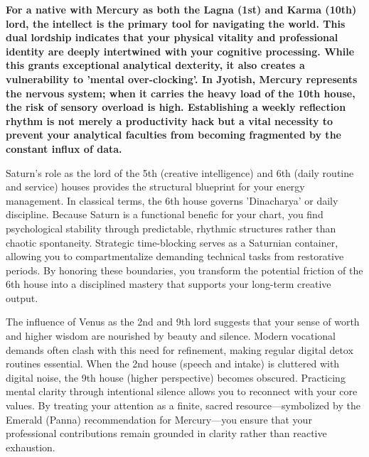 
\label{topic63}

{\fontsize{9.5}{13.8}\selectfont\bfseries\color{DeepSlate} For a native with Mercury as both the Lagna (1st) and Karma (10th) lord, the intellect is the primary tool for navigating the world. This dual lordship indicates that your physical vitality and professional identity are deeply intertwined with your cognitive processing. While this grants exceptional analytical dexterity, it also creates a vulnerability to 'mental over-clocking'. In Jyotish, Mercury represents the nervous system; when it carries the heavy load of the 10th house, the risk of sensory overload is high. Establishing a weekly reflection rhythm is not merely a productivity hack but a vital necessity to prevent your analytical faculties from becoming fragmented by the constant influx of data.}\par\vspace{2mm}

{\fontsize{9}{13}\selectfont Saturn's role as the lord of the 5th (creative intelligence) and 6th (daily routine and service) houses provides the structural blueprint for your energy management. In classical terms, the 6th house governs 'Dinacharya' or daily discipline. Because Saturn is a functional benefic for your chart, you find psychological stability through predictable, rhythmic structures rather than chaotic spontaneity. Strategic time-blocking serves as a Saturnian container, allowing you to compartmentalize demanding technical tasks from restorative periods. By honoring these boundaries, you transform the potential friction of the 6th house into a disciplined mastery that supports your long-term creative output.}\par\vspace{1.8mm}

{\fontsize{9}{13}\selectfont The influence of Venus as the 2nd and 9th lord suggests that your sense of worth and higher wisdom are nourished by beauty and silence. Modern vocational demands often clash with this need for refinement, making regular digital detox routines essential. When the 2nd house (speech and intake) is cluttered with digital noise, the 9th house (higher perspective) becomes obscured. Practicing mental clarity through intentional silence allows you to reconnect with your core values. By treating your attention as a finite, sacred resource---symbolized by the Emerald (Panna) recommendation for Mercury---you ensure that your professional contributions remain grounded in clarity rather than reactive exhaustion.}\par\vspace{1.8mm}

